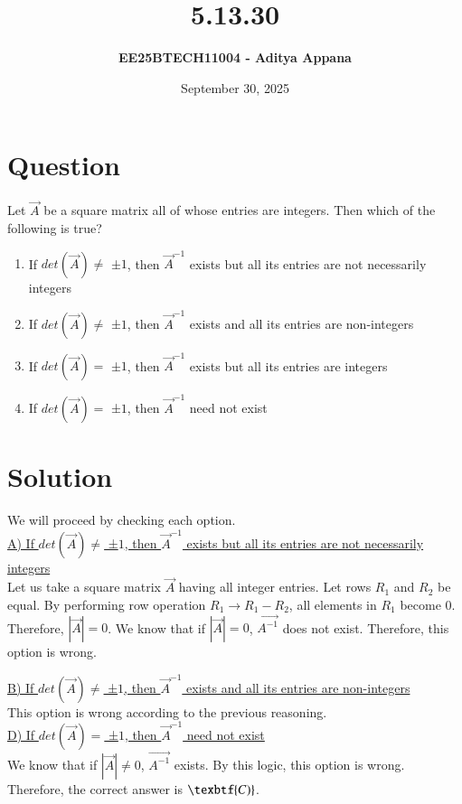 \documentclass[12pt]{article}
\title{\textbf{5.13.30}}
\author{\textbf{EE25BTECH11004 - Aditya Appana}}
\date{September 30, 2025}
\begin{document}
\maketitle

\section*{Question}
Let $\vec{A}$ be a square matrix all of whose entries are integers. Then which of the
following is true?
\begin{enumerate}
    \item If $det(\vec{A})\neq $ ±$1$, then $\vec{A}^{-1}$ exists but all its entries are not necessarily integers
    \item If $det(\vec{A})\neq $ ±$1$, then $\vec{A}^{-1}$ exists and all its entries are non-integers
    \item If $det(\vec{A}) = $ ±$1$, then $\vec{A}^{-1}$ exists but all its entries are integers
    \item If $det(\vec{A})= $ ±$1$, then $\vec{A}^{-1}$ need not exist

\end{enumerate}

\section*{Solution}
We will proceed by checking each option.\\

\underline{A) If $det(\vec{A})\neq $ ±$1$, then $\vec{A}^{-1}$ exists but all its entries are not necessarily integers} \\

Let us take a square matrix $\vec{A}$ having all integer entries. Let rows $R_1$ and $R_2$ be equal.
By performing row operation $R_1 \xrightarrow{} R_1 - R_2$, all elements in $R_1 $ become 0. Therefore, $|\vec{A}| = 0$. We know that if $|\vec{A}|= 0$, $\vec{A^{-1}}$ does not exist. Therefore, this option is wrong.\\

\newpage

\underline{B) If $det(\vec{A})\neq $ ±$1$, then $\vec{A}^{-1}$ exists and all its entries are non-integers}\\

This option is wrong according to the previous reasoning.\\


\underline{D) If $det(\vec{A})= $ ±$1$, then $\vec{A}^{-1}$ need not exist}\\

We know that if $|\vec{A}| \neq 0$, $\vec{A^{-1}}$ exists. By this logic, this option is wrong.\\

Therefore, the correct answer is $\texbtf{C)}$.
\end{document}
